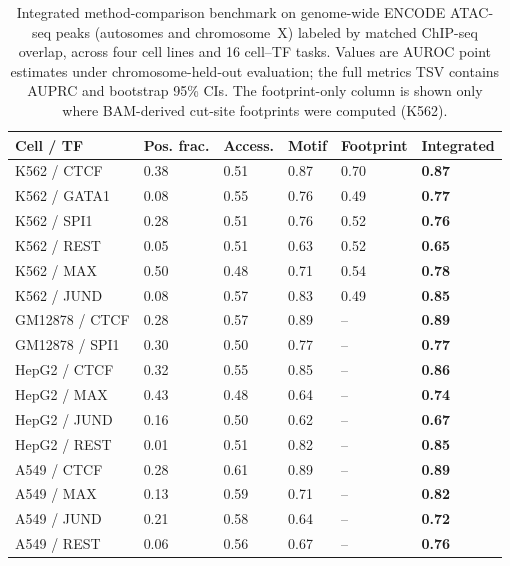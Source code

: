 \documentclass[biomedinformatics,article,submit,pdftex,moreauthors]{Definitions/mdpi}
\begin{document}
\begin{table}[H]
\caption{Integrated method-comparison benchmark on genome-wide ENCODE ATAC-seq
peaks (autosomes and chromosome~X) labeled by matched ChIP-seq overlap, across four
cell lines and 16 cell--TF tasks. Values are AUROC point estimates under
chromosome-held-out evaluation; the full metrics TSV contains AUPRC and bootstrap
95\% CIs. The footprint-only column is shown only where BAM-derived cut-site
footprints were computed (K562).\label{tab:methods}}
\begin{tabularx}{\textwidth}{llZZZZ}
\toprule
\textbf{Cell / TF} & \textbf{Pos. frac.} & \textbf{Access.} & \textbf{Motif} & \textbf{Footprint} & \textbf{Integrated}\\
\midrule
K562 / CTCF & 0.38 & 0.51 & 0.87 & 0.70 & \textbf{0.87}\\
K562 / GATA1 & 0.08 & 0.55 & 0.76 & 0.49 & \textbf{0.77}\\
K562 / SPI1 & 0.28 & 0.51 & 0.76 & 0.52 & \textbf{0.76}\\
K562 / REST & 0.05 & 0.51 & 0.63 & 0.52 & \textbf{0.65}\\
K562 / MAX & 0.50 & 0.48 & 0.71 & 0.54 & \textbf{0.78}\\
K562 / JUND & 0.08 & 0.57 & 0.83 & 0.49 & \textbf{0.85}\\
\midrule
GM12878 / CTCF & 0.28 & 0.57 & 0.89 & -- & \textbf{0.89}\\
GM12878 / SPI1 & 0.30 & 0.50 & 0.77 & -- & \textbf{0.77}\\
\midrule
HepG2 / CTCF & 0.32 & 0.55 & 0.85 & -- & \textbf{0.86}\\
HepG2 / MAX & 0.43 & 0.48 & 0.64 & -- & \textbf{0.74}\\
HepG2 / JUND & 0.16 & 0.50 & 0.62 & -- & \textbf{0.67}\\
HepG2 / REST & 0.01 & 0.51 & 0.82 & -- & \textbf{0.85}\\
\midrule
A549 / CTCF & 0.28 & 0.61 & 0.89 & -- & \textbf{0.89}\\
A549 / MAX & 0.13 & 0.59 & 0.71 & -- & \textbf{0.82}\\
A549 / JUND & 0.21 & 0.58 & 0.64 & -- & \textbf{0.72}\\
A549 / REST & 0.06 & 0.56 & 0.67 & -- & \textbf{0.76}\\
\bottomrule
\end{tabularx}
\end{table}
\end{document}
